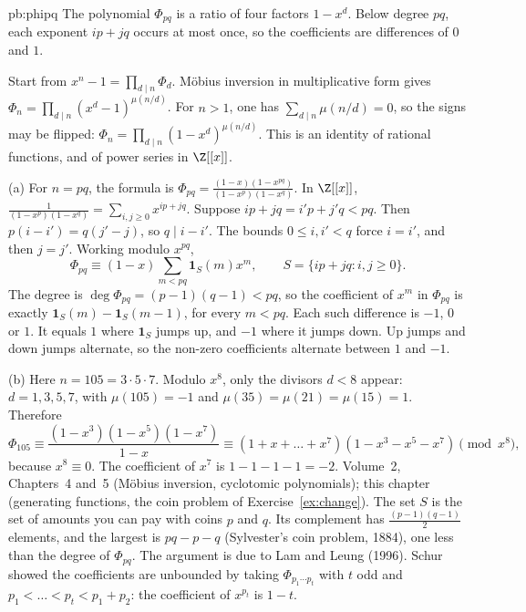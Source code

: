 \begin{solution}{pb:phipq}
\idea The polynomial $\Phi_{pq}$ is a ratio of four factors $1-x^d$. Below degree $pq$, each exponent $ip+jq$ occurs at most once, so the coefficients are differences of $0$ and $1$.

\writeup Start from $x^n-1=\prod_{d\mid n}\Phi_d$. Möbius inversion in multiplicative form gives
$\Phi_n=\prod_{d\mid n}(x^d-1)^{\mu(n/d)}$. For $n>1$, one has $\sum_{d\mid n}\mu(n/d)=0$, so the signs may be flipped:
$\Phi_n=\prod_{d\mid n}(1-x^d)^{\mu(n/d)}$. This is an identity of rational functions, and of power series in $\Z[[x]]$.

(a) For $n=pq$, the formula is $\Phi_{pq}=\frac{(1-x)(1-x^{pq})}{(1-x^p)(1-x^q)}$. In $\Z[[x]]$,
$\frac1{(1-x^p)(1-x^q)}=\sum_{i,j\ge0}x^{ip+jq}$. Suppose $ip+jq=i'p+j'q<pq$. Then $p(i-i')=q(j'-j)$, so $q\mid i-i'$. The bounds
$0\le i,i'<q$ force $i=i'$, and then $j=j'$. Working modulo $x^{pq}$,
\[
\Phi_{pq}\equiv(1-x)\sum_{m<pq}\mathbf 1_S(m)x^m,\qquad S=\{ip+jq:i,j\ge0\}.
\]
The degree is $\deg\Phi_{pq}=(p-1)(q-1)<pq$, so the coefficient of $x^m$ in $\Phi_{pq}$ is exactly $\mathbf 1_S(m)-\mathbf 1_S(m-1)$,
for every $m<pq$. Each such difference is $-1$, $0$ or $1$. It equals $1$ where $\mathbf 1_S$ jumps up, and $-1$ where it jumps down.
Up jumps and down jumps alternate, so the non-zero coefficients alternate between $1$ and $-1$.

(b) Here $n=105=3\cdot5\cdot7$. Modulo $x^8$, only the divisors $d<8$ appear: $d=1,3,5,7$, with $\mu(105)=-1$ and $\mu(35)=\mu(21)=\mu(15)
=1$. Therefore
\[
\Phi_{105}\equiv\frac{(1-x^3)(1-x^5)(1-x^7)}{1-x}\equiv(1+x+\dots+x^7)(1-x^3-x^5-x^7)\pmod{x^8},
\]
because $x^8\equiv0$. The coefficient of $x^7$ is $1-1-1-1=-2$.
\tools Volume~2, Chapters~4 and~5 (Möbius inversion, cyclotomic polynomials); this chapter (generating functions, the
coin problem of Exercise~\ref{ex:change}).
\leads The set $S$ is the set of amounts you can pay with coins $p$ and $q$. Its complement has $\frac{(p-1)(q-1)}2$ elements, and the
largest is $pq-p-q$ (Sylvester's coin problem, 1884), one less than the degree of $\Phi_{pq}$. The
argument is due to Lam and Leung (1996). Schur showed the coefficients are unbounded by taking $\Phi_{p_1\cdots p_t}$ with
$t$ odd and $p_1<\dots<p_t<p_1+p_2$: the coefficient of $x^{p_t}$ is $1-t$.
\end{solution}

